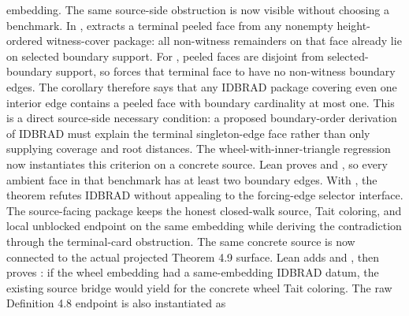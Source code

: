 \documentclass[11pt]{article}
\begin{document}
embedding.
The same source-side obstruction is now visible without choosing a benchmark.
In ,
extracts a terminal peeled face from any nonempty height-ordered witness-cover
package: all non-witness remainders on that face already lie on selected
boundary support.  For
, peeled faces are disjoint
from selected-boundary support, so
forces that terminal face to have no non-witness boundary edges.  The corollary
therefore says that any IDBRAD package covering even one interior edge contains
a peeled face with boundary cardinality at most one.  This is a direct
source-side necessary condition: a proposed boundary-order derivation of IDBRAD
must explain the terminal singleton-edge face rather than only supplying
coverage and root distances.
The wheel-with-inner-triangle regression now instantiates this criterion on a
concrete source.  Lean proves
 and
, so every ambient face in
that benchmark has at least two boundary edges.  With
, the theorem
refutes IDBRAD without appealing to the forcing-edge selector interface.  The
source-facing package
keeps the honest closed-walk source, Tait coloring, and local unblocked
endpoint on the same embedding while deriving the contradiction through the
terminal-card obstruction.
The same concrete source is now connected to the actual projected Theorem 4.9
surface.  Lean adds
 and
, then proves
:
if the wheel embedding had a same-embedding IDBRAD datum, the existing source
bridge would yield
 for the concrete wheel
Tait coloring.  The raw Definition 4.8 endpoint is also instantiated as
\end{document}
